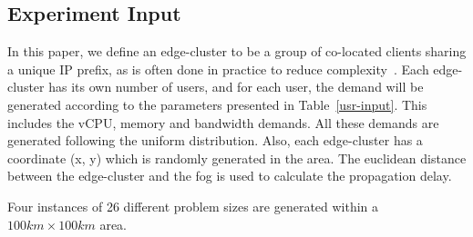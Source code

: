 \documentclass[10pt,journal,compsoc]{IEEEtran}
\begin{document}
\subsection{Experiment Input}
In this paper, we define an edge-cluster to be a group of co-located clients sharing a unique IP prefix, as is often done in practice to reduce complexity~\cite{nygren2010akamai}. Each edge-cluster has its own number of users, and for each user, the demand will be generated according to the parameters presented in Table~\ref{usr-input}. This includes the vCPU, memory and bandwidth demands. All these demands are generated following the uniform distribution. Also, each edge-cluster has a coordinate (x, y) which is randomly generated in the area. The euclidean distance between the edge-cluster and the fog is used to calculate the propagation delay.

\begin{table}[th]
\centering
\caption{Edge cluster demands}
\label{usr-input}
\end{table}

Four instances of 26 different problem sizes are generated within a $100 km \times 100 km$ area.
\end{document}
